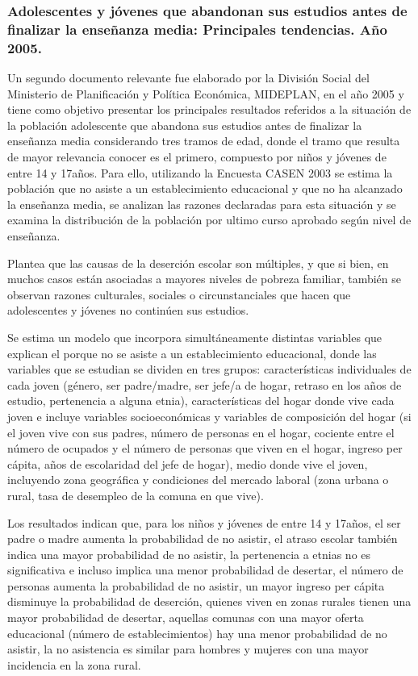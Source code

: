 \subsubsection{Adolescentes y jóvenes que abandonan sus estudios antes de finalizar la enseñanza media: Principales tendencias. Año 2005.} 
Un segundo documento relevante fue elaborado por la División Social del Ministerio de Planificación y Política Económica, MIDEPLAN, en el año 2005 y tiene como objetivo presentar los principales resultados referidos a la situación de la población adolescente que abandona sus estudios antes de finalizar la enseñanza media considerando tres tramos de edad, donde el tramo que resulta de mayor relevancia conocer es el primero, compuesto por niños y jóvenes de entre 14 y 17años. Para ello, utilizando la Encuesta CASEN 2003 se estima la población que no asiste a un establecimiento educacional y que no ha alcanzado la enseñanza media, se analizan las razones declaradas para esta situación y se examina  la distribución de la población por ultimo curso aprobado según nivel de enseñanza. 

Plantea que las causas de la deserción escolar son múltiples, y que si bien, en muchos casos están asociadas a mayores niveles de pobreza familiar, también se observan razones culturales, sociales o circunstanciales que hacen que adolescentes y jóvenes no continúen sus estudios.

Se estima un modelo que incorpora simultáneamente distintas variables que explican el porque no se asiste a un establecimiento educacional, donde las variables que se estudian se dividen en tres grupos: características individuales de cada joven (género, ser padre/madre, ser jefe/a de hogar, retraso en los años de estudio, pertenencia a alguna etnia), características del hogar donde vive cada joven e incluye variables socioeconómicas y variables de composición del hogar (si el joven vive con sus padres, número de personas en el hogar, cociente entre el número de ocupados y el número de personas que viven en el hogar, ingreso per cápita, años de escolaridad del jefe de hogar), medio donde vive el joven, incluyendo zona geográfica y condiciones del mercado laboral (zona urbana o rural, tasa de desempleo de la comuna en que vive).

Los resultados indican que, para los niños y jóvenes de entre 14 y 17años,  el ser padre o madre aumenta la probabilidad de no asistir, el atraso escolar también indica una mayor probabilidad de no asistir, la pertenencia a etnias no es significativa e incluso implica una menor probabilidad de desertar, el número de personas aumenta la probabilidad de no asistir, un mayor ingreso per cápita disminuye la probabilidad de deserción, quienes viven en zonas rurales tienen una mayor probabilidad de desertar, aquellas comunas con una mayor oferta educacional (número de establecimientos) hay una menor probabilidad de no asistir, la no asistencia es similar para hombres y mujeres con una mayor incidencia en la zona rural.


